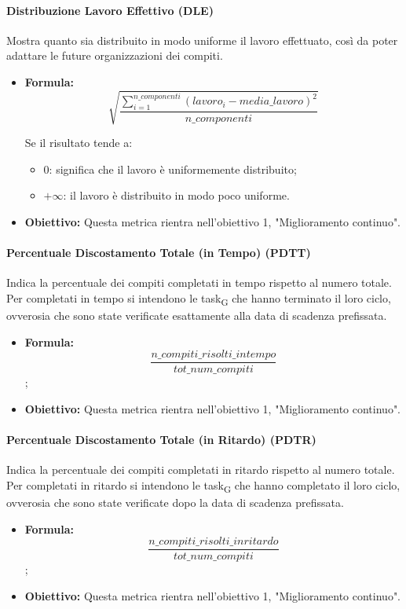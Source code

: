 	\paragraph{Distribuzione Lavoro Effettivo (DLE)}
	Mostra quanto sia distribuito in modo uniforme il lavoro effettuato, così da poter adattare le future organizzazioni dei compiti.
	\begin{itemize}
		\item \textbf{Formula:}\[\sqrt{\frac{\sum_{i=1}^{n\_componenti}(lavoro_i-media\_lavoro)^2}{n\_componenti}}\]
		
		Se il risultato tende a:
		\begin{itemize}
			\item 0: significa che il lavoro è uniformemente distribuito;
			\item $+\infty$: il lavoro è distribuito in modo poco uniforme.
		\end{itemize}
		\item \textbf{Obiettivo:} Questa metrica rientra nell'obiettivo 1, "Miglioramento continuo".
	\end{itemize}
	
	\paragraph{Percentuale Discostamento Totale (in Tempo) (PDTT)}
	Indica la percentuale dei compiti completati in tempo rispetto al numero totale. Per completati in tempo si intendono le task\textsubscript{G} che hanno terminato il loro ciclo, ovverosia che sono state verificate esattamente alla data di scadenza prefissata.
	\begin{itemize}
		\item \textbf{Formula:}\[\frac{n\_compiti\_risolti\_intempo}{tot\_num\_compiti}\];
		\item \textbf{Obiettivo:} Questa metrica rientra nell'obiettivo 1, "Miglioramento continuo".
	\end{itemize}
	
	\paragraph{Percentuale Discostamento Totale (in Ritardo) (PDTR)}
	Indica la percentuale dei compiti completati in ritardo rispetto al numero totale. Per completati in ritardo si intendono le task\textsubscript{G} che hanno completato il loro ciclo, ovverosia che sono state verificate dopo la data di scadenza prefissata.
	\begin{itemize}
		\item \textbf{Formula:}\[\frac{n\_compiti\_risolti\_inritardo}{tot\_num\_compiti}\];
		\item \textbf{Obiettivo:} Questa metrica rientra nell'obiettivo 1, "Miglioramento continuo".
	\end{itemize}
	
